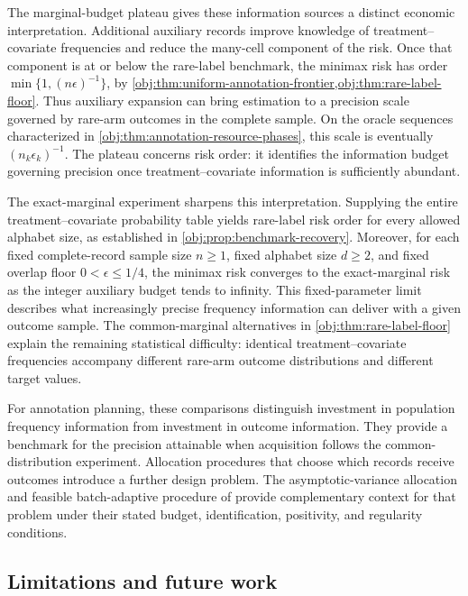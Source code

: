\documentclass[11pt]{article}
\begin{document}
The marginal-budget plateau gives these information sources a distinct economic interpretation. Additional auxiliary records improve knowledge of treatment--covariate frequencies and reduce the many-cell component of the risk. Once that component is at or below the rare-label benchmark, the minimax risk has order \(\min\{1,(n\epsilon)^{-1}\}\), by \cref{obj:thm:uniform-annotation-frontier,obj:thm:rare-label-floor}. Thus auxiliary expansion can bring estimation to a precision scale governed by rare-arm outcomes in the complete sample. On the oracle sequences characterized in \cref{obj:thm:annotation-resource-phases}, this scale is eventually \((n_k\epsilon_k)^{-1}\). The plateau concerns risk order: it identifies the information budget governing precision once treatment--covariate information is sufficiently abundant.

The exact-marginal experiment sharpens this interpretation. Supplying the entire treatment--covariate probability table yields rare-label risk order for every allowed alphabet size, as established in \cref{obj:prop:benchmark-recovery}. Moreover, for each fixed complete-record sample size \(n\ge1\), fixed alphabet size \(d\ge2\), and fixed overlap floor \(0<\epsilon\le1/4\), the minimax risk converges to the exact-marginal risk as the integer auxiliary budget tends to infinity. This fixed-parameter limit describes what increasingly precise frequency information can deliver with a given outcome sample. The common-marginal alternatives in \cref{obj:thm:rare-label-floor} explain the remaining statistical difficulty: identical treatment--covariate frequencies accompany different rare-arm outcome distributions and different target values.

For annotation planning, these comparisons distinguish investment in population frequency information from investment in outcome information. They provide a benchmark for the precision attainable when acquisition follows the common-distribution experiment. Allocation procedures that choose which records receive outcomes introduce a further design problem. The asymptotic-variance allocation and feasible batch-adaptive procedure of \citet[Theorems 4.2 and 5.1 of the arXiv manuscript]{NwankwoGoldkindZhou2026Annotations} provide complementary context for that problem under their stated budget, identification, positivity, and regularity conditions.

\subsection{Limitations and future work}
\end{document}
